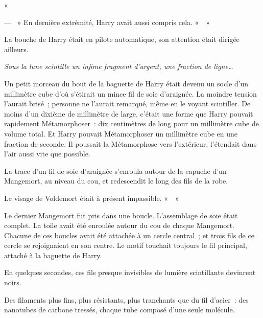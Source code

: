«~

--- ~» En dernière extrémité, Harry avait aussi compris cela. «~~»

La bouche de Harry était en pilote automatique, son attention était dirigée ailleurs.

\emph{Sous la lune scintille un infime fragment d'argent, une fraction de ligne…}

Un petit morceau du bout de la baguette de Harry était devenu un socle d'un millimètre cube d'où s'étirait un mince fil de soie d'araignée. La moindre tension l'aurait brisé~; personne ne l'aurait remarqué, même en le voyant scintiller. De moins d'un dixième de millimètre de large, c'était une forme que Harry pouvait rapidement Métamorphoser~: dix centimètres de long pour un millimètre cube de volume total. Et Harry pouvait Métamorphoser un millimètre cube en une fraction de seconde. Il poussait la Métamorphose vers l'extérieur, l'étendait dans l'air aussi vite que possible.

La trace d'un fil de soie d'araignée s'enroula autour de la capuche d'un Mangemort, au niveau du cou, et redescendit le long des fils de la robe.

Le visage de Voldemort était à présent impassible. «~~»

Le dernier Mangemort fut pris dans une boucle. L'assemblage de soie était complet. La toile avait été enroulée autour du cou de chaque Mangemort. Chacune de ces boucles avait été attachée à un cercle central~; et trois fils de ce cercle se rejoignaient en son centre. Le motif touchait toujours le fil principal, attaché à la baguette de Harry.

En quelques secondes, ces fils presque invisibles de lumière scintillante devinrent noirs.

Des filaments plus fins, plus résistants, plus tranchants que du fil d'acier~: des nanotubes de carbone tressés, chaque tube composé d'une seule molécule.

